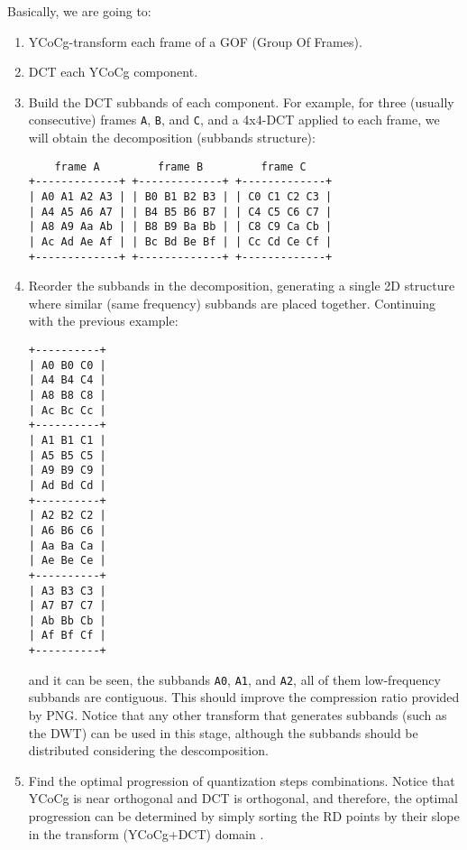 Basically, we are going to:
\begin{enumerate}
\item YCoCg-transform each frame of a GOF (Group Of Frames).
\item DCT each YCoCg component.
\item Build the DCT subbands of each component. For example, for three
  (usually consecutive) frames \verb|A|, \verb|B|, and \verb|C|, and a
  4x4-DCT applied to each frame, we will obtain the decomposition
  (subbands structure):
\begin{verbatim}
    frame A         frame B         frame C
+-------------+ +-------------+ +-------------+
| A0 A1 A2 A3 | | B0 B1 B2 B3 | | C0 C1 C2 C3 |
| A4 A5 A6 A7 | | B4 B5 B6 B7 | | C4 C5 C6 C7 |
| A8 A9 Aa Ab | | B8 B9 Ba Bb | | C8 C9 Ca Cb |
| Ac Ad Ae Af | | Bc Bd Be Bf | | Cc Cd Ce Cf |
+-------------+ +-------------+ +-------------+
\end{verbatim}

\item Reorder the subbands in the decomposition, generating a single
  2D structure where similar (same frequency) subbands are placed
  together. Continuing with the previous example:
\begin{verbatim}
+----------+
| A0 B0 C0 |
| A4 B4 C4 |
| A8 B8 C8 |
| Ac Bc Cc |
+----------+
| A1 B1 C1 |
| A5 B5 C5 |
| A9 B9 C9 |
| Ad Bd Cd |
+----------+
| A2 B2 C2 |
| A6 B6 C6 |
| Aa Ba Ca |
| Ae Be Ce |
+----------+
| A3 B3 C3 |
| A7 B7 C7 |
| Ab Bb Cb |
| Af Bf Cf |
+----------+
\end{verbatim}
  and it can be seen, the subbands \verb|A0|, \verb|A1|, and
  \verb|A2|, all of them low-frequency subbands are contiguous. This
  should improve the compression ratio provided by PNG.  Notice that
  any other transform that generates subbands (such as the DWT) can be
  used in this stage, although the subbands should be distributed
  considering the descomposition.

\item Find the optimal progression of quantization steps
  combinations. Notice that YCoCg is near orthogonal and DCT is
  orthogonal, and therefore, the optimal progression can be determined
  by simply sorting the RD points by their slope in the transform
  (YCoCg+DCT) domain .


\end{enumerate}
